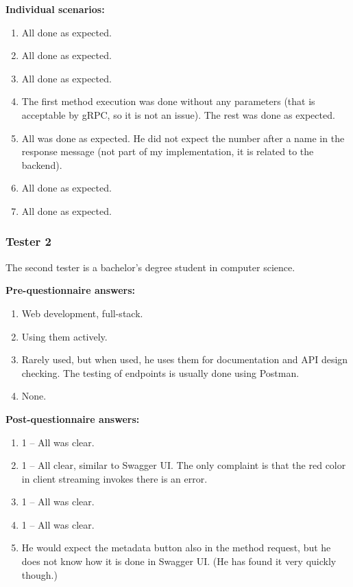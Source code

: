 \textbf{Individual scenarios:}
\begin{enumerate}
    \item All done as expected.
    \item All done as expected.
    \item All done as expected.
    \item The first method execution was done without any parameters (that is acceptable by gRPC, so it is not an issue).
    The rest was done as expected.
    \item All was done as expected.
    He did not expect the number after a name in the response message (not part of my implementation, it is related to the backend).
    \item All done as expected.
    \item All done as expected.
\end{enumerate}

\subsubsection{Tester 2}
The second tester is a bachelor's degree student in computer science.

\textbf{Pre-questionnaire answers:}
\begin{enumerate}
    \item Web development, full-stack.
    \item Using them actively.
    \item Rarely used, but when used, he uses them for documentation and API design checking.
    The testing of endpoints is usually done using Postman.
    \item None.
\end{enumerate}

\textbf{Post-questionnaire answers:}
\begin{enumerate}
    \item 1 -- All was clear.
    \item 1 -- All clear, similar to Swagger UI\@.
    The only complaint is that the red color in client streaming invokes there is an error.
    \item 1 -- All was clear.
    \item 1 -- All was clear.
    \item He would expect the metadata button also in the method request, but he does not know how it is done in Swagger UI\@.
    (He has found it very quickly though.)
\end{enumerate}

